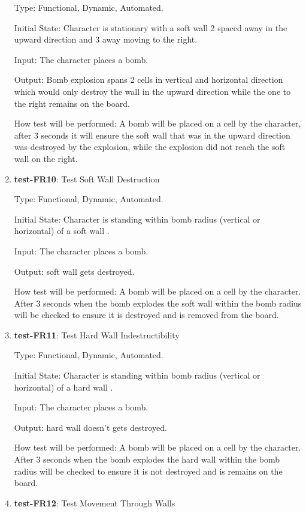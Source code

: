 \documentclass[12pt, titlepage]{article}
\begin{document}
\begin{enumerate}
Type: Functional, Dynamic, Automated.
					
Initial State: Character is stationary with a soft wall 2 spaced away in the upward direction and 3 away moving to the right.
					
Input: The character places a bomb.
					
Output: Bomb explosion spans 2 cells in vertical and horizontal direction which would only destroy the wall in the upward direction while the one to the right remains on the board.
					
How test will be performed: A bomb will be placed on a cell by the character, after 3 seconds it will ensure the soft wall that was in the upward direction was destroyed by the explosion, while the explosion did not reach the soft wall on the right.

\item{\textbf{test-FR10}: Test Soft Wall Destruction\\}

Type: Functional, Dynamic, Automated.
					
Initial State: Character is standing within bomb radius (vertical or horizontal) of a soft wall .
					
Input: The character places a bomb.
					
Output: soft wall gets destroyed.
					
How test will be performed: A bomb will be placed on a cell by the character. After 3 seconds when the bomb explodes the soft wall within the bomb radius will be checked to ensure it is destroyed and is removed from the board.

\item{\textbf{test-FR11}: Test Hard Wall Indestructibility\\} 

Type: Functional, Dynamic, Automated.
					
Initial State: Character is standing within bomb radius (vertical or horizontal) of a hard wall .
					
Input: The character places a bomb.
					
Output: hard wall doesn't gets destroyed.
					
How test will be performed: A bomb will be placed on a cell by the character. After 3 seconds when the bomb explodes the hard wall within the bomb radius will be checked to ensure it is not destroyed and is remains on the board.

\item{\textbf{test-FR12}: Test Movement Through Walls\\}


\end{enumerate}
\end{document}
